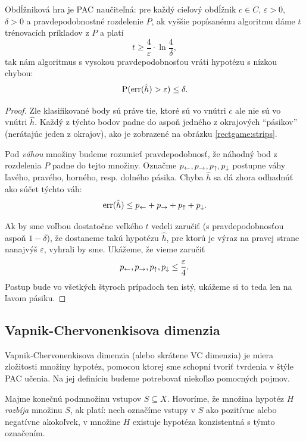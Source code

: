 \begin{theorem}
  Obdĺžniková hra je PAC naučiteľná: pre každý cieľový obdĺžnik $c \in C$,
  $\varepsilon > 0$, $\delta > 0$ a pravdepodobnostné rozdelenie $P$, ak
  vyššie popísanému algoritmu dáme $t$ trénovacích príkladov z $P$ a
  platí
  $$ t \geq \frac{4}{\varepsilon} \cdot \ln{\frac{4}{\delta}}, $$
  tak nám algoritmus s vysokou pravdepodobnosťou vráti hypotézu s nízkou
  chybou:
  $$ \operatorname*{\mathrm{P}}(\mathrm{err}(\hat{h}) > \varepsilon) \leq \delta. $$
\end{theorem}
\begin{proof}
  Zle klasifikované body sú práve tie, ktoré sú vo vnútri $c$ ale nie sú
  vo vnútri $\hat{h}$. Každý z týchto bodov padne do aspoň jedného
  z okrajových ``pásikov'' (nerátajúc jeden z okrajov), ako je
  zobrazené na obrázku \ref{rectgame:strips}.
  
  Pod \emph{váhou} množiny budeme rozumieť pravdepodobnosť, že náhodný
  bod z rozdelenia $P$ padne do tejto množiny.
  Označme $p_\leftarrow, p_\rightarrow, p_\uparrow, p_\downarrow$ postupne váhy ľavého,
  pravého, horného, resp. dolného pásika. Chyba $\hat{h}$ sa dá zhora
  odhadnúť ako súčet týchto váh:
  $$ \mathrm{err}(\hat{h}) \leq p_\leftarrow + p_\rightarrow + p_\uparrow + p_\downarrow. $$
  
  Ak by sme voľbou dostatočne veľkého $t$ vedeli zaručiť
  (s pravdepodobnosťou aspoň $1 - \delta$), že dostaneme takú hypotézu
  $\hat{h}$, pre ktorú je výraz na pravej strane nanajvýš $\varepsilon$,
  vyhrali by sme. Ukážeme, že vieme zaručiť
  $$ p_\leftarrow, p_\rightarrow, p_\uparrow, p_\downarrow \leq \frac{\varepsilon}{4}. $$
  Postup bude vo všetkých štyroch prípadoch ten istý, ukážeme si to
  teda len na ľavom pásiku.
  
\end{proof}




\subsection{Vapnik-Chervonenkisova dimenzia}

Vapnik-Chervonenkisova dimenzia (alebo skrátene VC dimenzia) je miera
zložitosti množiny hypotéz, pomocou ktorej sme schopní tvoriť tvrdenia
v štýle PAC učenia. Na jej definíciu budeme potrebovať niekoľko pomocných
pojmov.

\begin{definition}
  Majme konečnú podmnožinu vstupov $S \subseteq X$. Hovoríme, že množina
  hypotéz $H$ \emph{rozbíja} množinu $S$, ak platí: nech označíme vstupy
  v $S$ ako pozitívne alebo negatívne akokoľvek, v množine $H$ existuje
  hypotéza konzistentná s týmto označením.
\end{definition}

